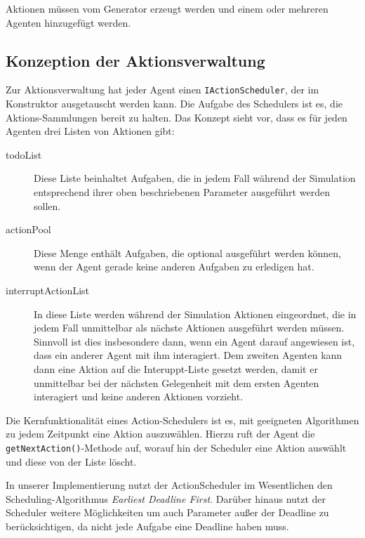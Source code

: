 Aktionen müssen vom Generator erzeugt werden und einem oder mehreren Agenten hinzugefügt werden.

\subsection{Konzeption der Aktionsverwaltung}\label{subsec:concept_actionhandling}
Zur Aktionsverwaltung hat jeder Agent einen \texttt{IActionScheduler}, der im Konstruktor ausgetauscht werden kann. Die Aufgabe des Schedulers ist es, die Aktions-Sammlungen bereit zu halten. Das Konzept sieht vor, dass es für jeden Agenten drei Listen von Aktionen gibt:
\begin{description}
	\item[todoList] Diese Liste beinhaltet Aufgaben, die in jedem Fall während der Simulation entsprechend ihrer oben beschriebenen Parameter ausgeführt werden sollen.
	\item[actionPool] Diese Menge enthält Aufgaben, die optional ausgeführt werden können, wenn der Agent gerade keine anderen Aufgaben zu erledigen hat.
	\item[interruptActionList] In diese Liste werden während der Simulation Aktionen eingeordnet, die in jedem Fall unmittelbar als nächste Aktionen ausgeführt werden müssen. Sinnvoll ist dies insbesondere dann, wenn ein Agent darauf angewiesen ist, dass ein anderer Agent mit ihm interagiert. Dem zweiten Agenten kann dann eine Aktion auf die Interuppt-Liste gesetzt werden, damit er unmittelbar bei der nächsten Gelegenheit mit dem ersten Agenten interagiert und keine anderen Aktionen vorzieht.
\end{description}

Die Kernfunktionalität eines Action-Schedulers ist es, mit geeigneten Algorithmen zu jedem Zeitpunkt eine Aktion auszuwählen. Hierzu ruft der Agent die \texttt{getNextAction()}-Methode auf, worauf hin der Scheduler eine Aktion auswählt und diese von der Liste löscht.

In unserer Implementierung nutzt der ActionScheduler im Wesentlichen den Scheduling-Algorithmus \emph{Earliest Deadline First}. Darüber hinaus nutzt der Scheduler weitere Möglichkeiten um auch Parameter außer der Deadline zu berücksichtigen, da nicht jede Aufgabe eine Deadline haben muss.  


